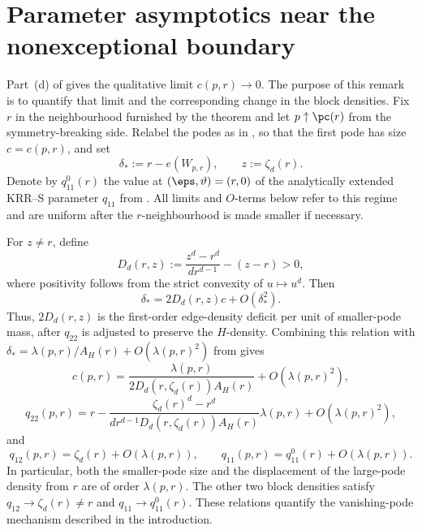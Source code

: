 \section{Parameter asymptotics near the nonexceptional boundary}
\label{app:bipodal-parameter-expansions}

\begin{remark}
\label{rmk:bipodal-parameter-expansions}
Part~\textup{(d)} of  gives the qualitative limit
\(c(p,r)\to0\).  The purpose of this remark is to quantify that limit and the
corresponding change in the block densities.  Fix \(r\) in the neighbourhood
furnished by the theorem and let \(p\uparrow\pc(r)\) from the
symmetry-breaking side.  Relabel the podes as in , so
that the first pode has size \(c=c(p,r)\), and set
\[
  \delta_*:=r-e(W_{p,r}),
  \qquad
  z:=\zeta_d(r).
\]
Denote by \(q_{11}^0(r)\) the value at
\((\eps,\vartheta)=(r,0)\) of the analytically extended KRR--S parameter
\(q_{11}\) from .
All limits and \(O\)-terms below refer to this regime and are uniform after
the \(r\)-neighbourhood is made smaller if necessary.

For \(z\ne r\), define
\begin{equation}\label{eq:edge-deficit-coefficient}
  D_d(r,z):=\frac{z^d-r^d}{d r^{d-1}}-(z-r)>0,
\end{equation}
where positivity follows from the strict convexity of \(u\mapsto u^d\).
Then
\[
  \delta_*=2D_d(r,z)c+O(\delta_*^2).
\]
Thus, \(2D_d(r,z)\) is the first-order edge-density deficit per unit of
smaller-pode mass, after \(q_{22}\) is adjusted to preserve the
\(H\)-density.  Combining this relation with
\(\delta_*=\lambda(p,r)/A_H(r)+O(\lambda(p,r)^2)\) from
 gives
\begin{equation}\label{eq:optimizer-block-size}
  c(p,r)=
  \frac{\lambda(p,r)}
  {2D_d(r,\zeta_d(r))A_H(r)}
  +O(\lambda(p,r)^2),
\end{equation}
\begin{equation}\label{eq:optimizer-block-density}
  q_{22}(p,r)
  =
  r-
  \frac{\zeta_d(r)^d-r^d}
       {d r^{d-1}D_d(r,\zeta_d(r))A_H(r)}
  \lambda(p,r)
  +O(\lambda(p,r)^2),
\end{equation}
and
\[
  q_{12}(p,r)=\zeta_d(r)+O(\lambda(p,r)),
  \qquad
  q_{11}(p,r)=q_{11}^0(r)+O(\lambda(p,r)).
\]
In particular, both the smaller-pode size and the displacement of the
large-pode density from \(r\) are of order \(\lambda(p,r)\).
The other two block densities satisfy
\(q_{12}\to\zeta_d(r)\ne r\) and
\(q_{11}\to q_{11}^0(r)\).  These relations quantify the vanishing-pode
mechanism described in the introduction.


\end{remark}
